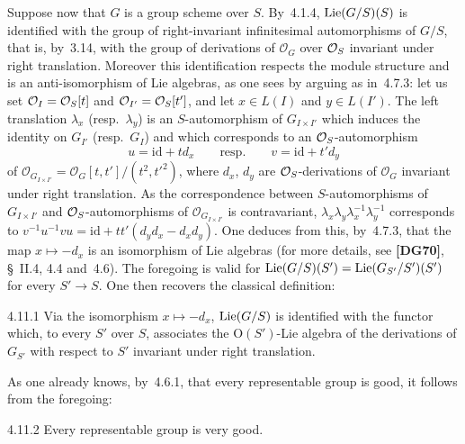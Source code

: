 \label{II.4.11}
Suppose now that \(G\) is a group scheme over \(S\). By~4.1.4,
\(\operatorname{Lie}(G/S)(S)\) is identified with the group of right-invariant infinitesimal
automorphisms of \(G/S\), that is, by~3.14, with the group of derivations
of \(\mathcal{O}_G\) over \(\mathcal{O}_S\) invariant under right translation. Moreover
this identification respects the module structure and is
an{\renewcommand{\thefootnote}{(84)}}
anti-isomorphism of Lie algebras, as one sees by arguing as in~4.7.3: let
us set \(\mathcal{O}_I=\mathcal{O}_S[t]\) and \(\mathcal{O}_{I'}=\mathcal{O}_S[t']\), and let
\(x\in L(I)\) and \(y\in L(I')\). The left translation \(\lambda_x\)
(resp.\ \(\lambda_y\)) is an \(S\)-automorphism of \(G_{I\times I'}\) which
induces the identity on \(G_{I'}\) (resp.\ \(G_I\)) and which corresponds to
an \(\mathcal{O}_S\)-automorphism
\[
u=\mathrm{id}+td_x
\qquad\text{resp.}\qquad
v=\mathrm{id}+t'd_y
\]
of \(\mathcal{O}_{G_{I\times I'}}=\mathcal{O}_G[t,t']/(t^2,{t'}^2)\), where
\(d_x\), \(d_y\) are \(\mathcal{O}_S\)-derivations of \(\mathcal{O}_G\) invariant under
right translation. As the correspondence between \(S\)-automorphisms of
\(G_{I\times I'}\) and \(\mathcal{O}_S\)-automorphisms of \(\mathcal{O}_{G_{I\times I'}}\)
is contravariant, \(\lambda_x\lambda_y\lambda_x^{-1}\lambda_y^{-1}\) corresponds
to \(v^{-1}u^{-1}vu=\mathrm{id}+tt'(d_yd_x-d_xd_y)\). One deduces from this,
by~4.7.3, that the map \(x\mapsto -d_x\) is an isomorphism of Lie algebras
(for more details, see \textbf{[DG70]}, \S~II.4, 4.4 and~4.6). The foregoing
is valid for \(\operatorname{Lie}(G/S)(S')=\operatorname{Lie}(G_{S'}/S')(S')\) for every \(S'\to S\).
One then recovers the classical
definition:{\renewcommand{\thefootnote}{(85)}}

\begin{scholium}{4.11.1}
\label{II.4.11.1}
Via the isomorphism \(x\mapsto -d_x\), \(\operatorname{Lie}(G/S)\) is identified with the
functor which, to every \(S'\) over \(S\), associates the
\(\mathrm{O}(S')\)-Lie algebra of the derivations of \(G_{S'}\) with respect
to \(S'\) invariant under right translation.
\end{scholium}

As one already knows, by~4.6.1, that every representable group is good, it
follows from the foregoing:

\begin{corollary}{4.11.2}
\label{II.4.11.2}
Every representable group is very good.
\end{corollary}

